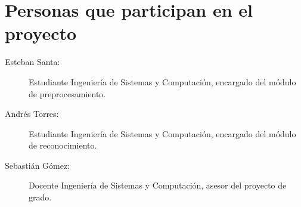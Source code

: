 \chapter{Personas que participan en el proyecto}
\label{sec:personas}
\begin{description}
\item[Esteban Santa:]Estudiante Ingenier\'ia de Sistemas y Computaci\'on, encargado del m\'odulo de preprocesamiento.
\item[Andr\'es Torres:]Estudiante Ingenier\'ia de Sistemas y Computaci\'on, encargado del m\'odulo de reconocimiento.
\item[Sebasti\'an G\'omez:]Docente Ingenier\'ia de Sistemas y Computaci\'on, asesor del proyecto de grado. 
\end{description}
\pagebreak